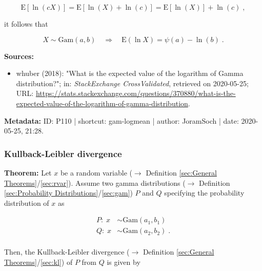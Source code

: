 \documentclass[a4paper,12pt,twoside]{book}
\begin{document}
\begin{equation} \label{eq:gam-logmean-logmean}
\mathrm{E}\left[\ln(cX)\right] = \mathrm{E}\left[\ln(X) + \ln(c)\right] = \mathrm{E}\left[\ln(X)\right] + \ln(c) \; ,
\end{equation}

it follows that

\begin{equation} \label{eq:gam-logmean-E-Y-s3}
X \sim \mathrm{Gam}(a,b) \quad \Rightarrow \quad \mathrm{E}(\ln X) = \psi(a) - \ln(b) \; .
\end{equation}


\vspace{1em}
\textbf{Sources:}
\begin{itemize}
\item whuber (2018): "What is the expected value of the logarithm of Gamma distribution?"; in: \textit{StackExchange CrossValidated}, retrieved on 2020-05-25; URL: \url{https://stats.stackexchange.com/questions/370880/what-is-the-expected-value-of-the-logarithm-of-gamma-distribution}.
\end{itemize}


\vspace{1em}
\textbf{Metadata:} ID: P110 | shortcut: gam-logmean | author: JoramSoch | date: 2020-05-25, 21:28.
\vspace{1em}



\subsubsection[\textbf{Kullback-Leibler divergence}]{Kullback-Leibler divergence} \label{sec:gam-kl}
\setcounter{equation}{0}

\textbf{Theorem:} Let $x$ be a random variable ($\rightarrow$ Definition \ref{sec:General Theorems}/\ref{sec:rvar}). Assume two gamma distributions ($\rightarrow$ Definition \ref{sec:Probability Distributions}/\ref{sec:gam}) $P$ and $Q$ specifying the probability distribution of $x$ as

\begin{equation} \label{eq:gam-kl-gams}
\begin{split}
P: \; x &\sim \mathrm{Gam}(a_1, b_1) \\
Q: \; x &\sim \mathrm{Gam}(a_2, b_2) \; . \\
\end{split}
\end{equation}

Then, the Kullback-Leibler divergence ($\rightarrow$ Definition \ref{sec:General Theorems}/\ref{sec:kl}) of $P$ from $Q$ is given by
\end{document}
